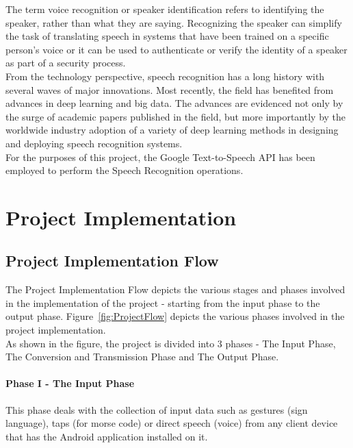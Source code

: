 \documentclass[14pt]{report}
\begin{document}
				The term voice recognition or speaker identification refers to identifying the speaker, rather than what they are saying. Recognizing the speaker can simplify the task of translating speech in systems that have been trained on a specific person's voice or it can be used to authenticate or verify the identity of a speaker as part of a security process.\\
				
				From the technology perspective, speech recognition has a long history with several waves of major innovations. Most recently, the field has benefited from advances in deep learning and big data. The advances are evidenced not only by the surge of academic papers published in the field, but more importantly by the worldwide industry adoption of a variety of deep learning methods in designing and deploying speech recognition systems.\\

				For the purposes of this project, the Google Text-to-Speech API has been employed to perform the Speech Recognition operations.
	\newpage


	\chapter{Project Implementation}\label{chapter4}
		
	

		\section{Project Implementation Flow}
		
				The Project Implementation Flow depicts the various stages and phases involved in the implementation of the project - starting from the input phase to the output phase. Figure~\ref{fig:ProjectFlow} depicts the various phases involved in the project implementation.\\

				As shown in the figure, the project is divided into 3 phases - The Input Phase, The Conversion and Transmission Phase and The Output Phase.
			\subsubsection{Phase I - The Input Phase}
				This phase deals with the collection of input data such as gestures (sign language), taps (for morse code) or direct speech (voice) from any client device that has the Android application installed on it.
\end{document}
